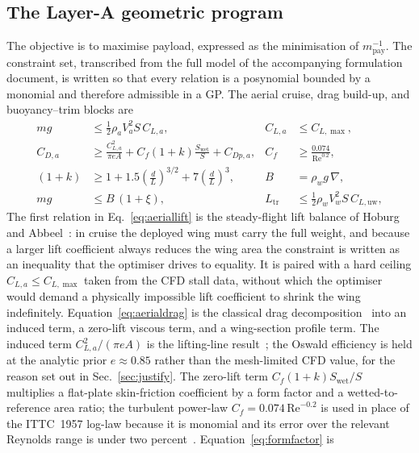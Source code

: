 \documentclass[conf]{new-aiaa}
\begin{document}
\subsection{The Layer-A geometric program}
The objective is to maximise payload, expressed as the minimisation of $m_{\text{pay}}^{-1}$. The
constraint set, transcribed from the full model of the accompanying formulation document, is written
so that every relation is a posynomial bounded by a monomial and therefore admissible in a GP. The
aerial cruise, drag build-up, and buoyancy--trim blocks are
\begin{align}
mg &\le \tfrac12\rho_a V_a^2 S\,C_{L,a}, & C_{L,a} &\le C_{L,\max}, \label{eq:aeriallift}\\
C_{D,a} &\ge \frac{C_{L,a}^2}{\pi e A} + C_{f}(1+k)\frac{S_{\text{wet}}}{S} + C_{Dp,a},
      & C_f &\ge \frac{0.074}{\mathrm{Re}^{0.2}}, \label{eq:aerialdrag}\\
(1+k) &\ge 1 + 1.5\!\left(\tfrac{d}{L}\right)^{3/2} + 7\!\left(\tfrac{d}{L}\right)^{3},
      & B &= \rho_w g\,\nabla, \label{eq:formfactor}\\
mg &\le B\,(1+\xi), & L_{\text{tr}} &\le \tfrac12\rho_w V_w^2 S\,C_{L,\text{uw}}, \label{eq:buoytrim}
\end{align}
The first relation in Eq.~\eqref{eq:aeriallift} is the steady-flight lift balance of
Hoburg and Abbeel~\cite{hoburg2014geometric}: in cruise the deployed wing must carry the full weight,
and because a larger lift coefficient always reduces the wing area the constraint is written as an
inequality that the optimiser drives to equality. It is paired with a hard ceiling
$C_{L,a}\le C_{L,\max}$ taken from the CFD stall data, without which the optimiser would demand a
physically impossible lift coefficient to shrink the wing indefinitely. Equation~\eqref{eq:aerialdrag}
is the classical drag decomposition~\cite{hoburg2014geometric,hoerner1965fluid} into an induced term,
a zero-lift viscous term, and a wing-section profile term. The induced term $C_{L,a}^2/(\pi e A)$ is
the lifting-line result~\cite{hoerner1985fluid}; the Oswald efficiency is held at the analytic prior
$e\approx0.85$ rather than the mesh-limited CFD value, for the reason set out in
Sec.~\ref{sec:justify}. The zero-lift term $C_f(1+k)S_{\text{wet}}/S$ multiplies a flat-plate
skin-friction coefficient by a form factor and a wetted-to-reference area ratio; the turbulent
power-law $C_f=0.074\,\mathrm{Re}^{-0.2}$ is used in place of the ITTC~1957 log-law because it is
monomial and its error over the relevant Reynolds range is under two
percent~\cite{hoburg2014geometric,myring1976theoretical}. Equation~\eqref{eq:formfactor} is
\end{document}
